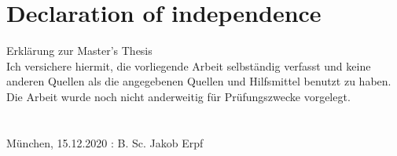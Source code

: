 \documentclass[a4paper,12pt]{report}
\begin{document}
\pagebreak

\chapter*{Declaration of independence}

Erkl\"arung zur Master’s Thesis
\newline \\
Ich versichere hiermit, die vorliegende Arbeit selbst\"andig verfasst und keine anderen Quellen als die angegebenen Quellen und Hilfsmittel benutzt zu haben. Die Arbeit wurde noch nicht anderweitig f\"ur Pr\"ufungszwecke vorgelegt. 
\newline \\ \\ \\
M\"unchen, 15.12.2020 : \hrulefill \newline
\hspace*{0mm}\phantom{M\"unchen, 11.12.2020: } B. Sc. Jakob Erpf
\end{document}
